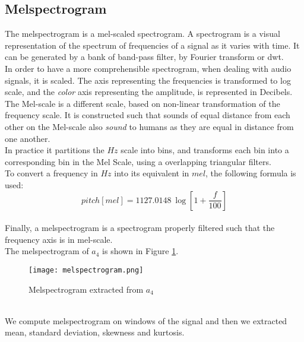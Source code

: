 \subsection{Melspectrogram}
The melspectrogram is a mel-scaled spectrogram. A spectrogram is a visual representation of the spectrum of frequencies of a signal as it varies with time. It can be generated by a bank of band-pass filter, by Fourier transform or \gls{dwt}.
\\ \indent
In order to have a more comprehensible spectrogram, when dealing with audio signals, it is scaled. The axis representing the frequencies is transformed to log scale, and the \textit{color} axis representing the amplitude, is represented in Decibels.
\\ \indent
The Mel-scale is a different scale, based on non-linear transformation of the frequency scale. It is constructed such that sounds of equal distance from each other on the Mel-scale also \textit{sound} to humans as they are equal in distance from one another.
\\
In practice it partitions the $Hz$ scale into bins, and transforms each bin into a corresponding bin in the Mel Scale, using a overlapping triangular filters.
\\
To convert a frequency in $Hz$ into its equivalent in $mel$, the following formula is used:
\begin{equation}
	pitch[mel]=1127.0148\:\log \left[ {1+\dfrac{f}{100}} \right]
\end{equation}
\\
Finally, a melspectrogram is a spectrogram properly filtered such that the frequency axis is in mel-scale.
\\
The melspectrogram of $a_4$ is shown in Figure \ref{fig:melspectrogram}.
\begin{figure}[h]
    \centering
    \texttt{[image: melspectrogram.png]} 
	\caption{Melspectrogram extracted from $a_4$}
    \label{fig:melspectrogram}
\end{figure}
\\
We compute melspectrogram on windows of the signal and then we extracted mean, standard deviation, skewness and kurtosis.

